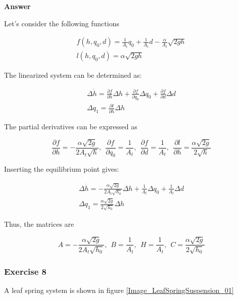 \textbf{Answer}

Let's consider the following functions

\begin{eqnarray}
f(h,q_0,d) = \frac{1}{A_t}q_0 + \frac{1}{A_t}d - \frac{\alpha}{A_t}\sqrt{2gh} \nonumber \\
l(h, q_0, d) = \alpha \sqrt{2gh}   \nonumber
\end{eqnarray}

The linearized system can be determined as: 

\begin{eqnarray}
\Delta \dot{h} = \frac{\partial f}{\partial h} \Delta h + \frac{\partial f}{\partial q_0} \Delta q_0 + \frac{\partial f}{\partial d} \Delta d  \nonumber \\
\Delta q_1 = \frac{\partial l}{\partial h} \Delta h   \nonumber
\end{eqnarray}

The partial derivatives can be expressed as 

\begin{equation}
\frac{\partial f}{\partial h} = -\frac{\alpha \sqrt{2g}}{2A_t\sqrt{h}}, ~~ \frac{\partial f}{\partial q_0} = \frac{1}{A_t}, ~~ \frac{\partial f}{\partial d} = \frac{1}{A_t}, ~~ \frac{\partial l}{\partial h} = \frac{\alpha \sqrt{2g}}{2\sqrt{h}}    \nonumber
\end{equation}

Inserting the equilibrium point gives: 

\begin{eqnarray}
\Delta \dot{h} = -\frac{\alpha \sqrt{2g}}{2A_t\sqrt{h_0}} \Delta h + \frac{1}{A_t} \Delta q_0 + \frac{1}{A_t} \Delta d  \nonumber \\
\Delta q_1 = \frac{\alpha \sqrt{2g}}{2\sqrt{h_0}} \Delta h   \nonumber
\end{eqnarray}

Thus, the matrices are

\begin{equation}
A =-\frac{\alpha \sqrt{2g}}{2A_t\sqrt{h_0}}, ~~ B = \frac{1}{A_t}, ~~ H = \frac{1}{A_t}, ~~ C= \frac{\alpha \sqrt{2g}}{2\sqrt{h_0}} \nonumber
\end{equation}

\subsubsection{Exercise 8}

A leaf spring system is shown in figure \ref{Image_LeafSpringSuspension_01}

